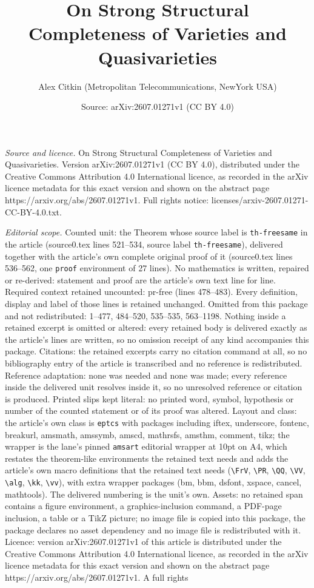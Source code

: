 \documentclass[10pt,a4paper]{amsart}
\title[On Strong Structural Completeness of Varieties and Quasivari]{On Strong Structural Completeness of Varieties and Quasivarieties}
\author{Alex Citkin (Metropolitan Telecommunications, NewYork USA)}
\date{Source: arXiv:2607.01271v1 (CC BY 4.0)}
\begin{document}
\maketitle

\noindent\emph{Source and licence.} On Strong Structural Completeness of Varieties and Quasivarieties. Version arXiv:2607.01271v1 (CC BY 4.0), distributed under the Creative Commons Attribution 4.0 International licence, as recorded in the arXiv licence metadata for this exact version and shown on the abstract page https://arxiv.org/abs/2607.01271v1. Full rights notice: licenses/arxiv-2607.01271-CC-BY-4.0.txt.\par\smallskip

\noindent\textit{Editorial scope.} Counted unit: the Theorem whose source label is \texttt{th-freesame} in the article (source0.tex lines 521--534, source label \texttt{th-freesame}), delivered together with the article's own complete original proof of it (source0.tex lines 536--562, one \texttt{proof} environment of 27 lines). No mathematics is written, repaired or re-derived: statement and proof are the article's own text line for line. Required context retained uncounted: pr-free (lines 478--483). Every definition, display and label of those lines is retained unchanged. Omitted from this package and not redistributed: 1--477, 484--520, 535--535, 563--1198. Nothing inside a retained excerpt is omitted or altered: every retained body is delivered exactly as the article's lines are written, so no omission receipt of any kind accompanies this package. Citations: the retained excerpts carry no citation command at all, so no bibliography entry of the article is transcribed and no reference is redistributed. Reference adaptation: none was needed and none was made; every reference inside the delivered unit resolves inside it, so no unresolved reference or citation is produced. Printed slips kept literal: no printed word, symbol, hypothesis or number of the counted statement or of its proof was altered. Layout and class: the article's own class is \texttt{eptcs} with packages including iftex, underscore, fontenc, breakurl, amsmath, amssymb, amscd, mathrsfs, amsthm, comment, tikz; the wrapper is the lane's pinned \texttt{amsart} editorial wrapper at 10pt on A4, which restates the theorem-like environments the retained text needs and adds the article's own macro definitions that the retained text needs (\texttt{\textbackslash FrV}, \texttt{\textbackslash PR}, \texttt{\textbackslash QQ}, \texttt{\textbackslash VV}, \texttt{\textbackslash alg}, \texttt{\textbackslash kk}, \texttt{\textbackslash vv}), with extra wrapper packages (bm, bbm, dsfont, xspace, cancel, mathtools). The delivered numbering is the unit's own. Assets: no retained span contains a figure environment, a graphics-inclusion command, a PDF-page inclusion, a table or a TikZ picture; no image file is copied into this package, the package declares no asset dependency and no image file is redistributed with it. Licence: version arXiv:2607.01271v1 of this article is distributed under the Creative Commons Attribution 4.0 International licence, as recorded in the arXiv licence metadata for this exact version and shown on the abstract page https://arxiv.org/abs/2607.01271v1. A full rights 
\end{document}
